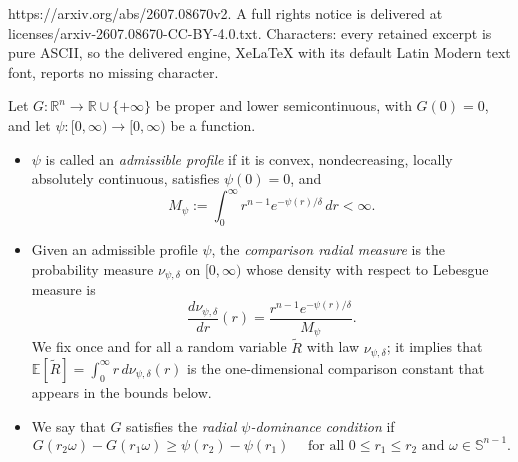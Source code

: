 \documentclass[10pt,a4paper]{amsart}
\begin{document}
https://arxiv.org/abs/2607.08670v2. A full rights notice is delivered at licenses/arxiv-2607.08670-CC-BY-4.0.txt. Characters: every retained excerpt is pure ASCII, so the delivered engine, XeLaTeX with its default Latin Modern text font, reports no missing character.
\begin{definition}Let $G\colon \mathbb{R}^n \to \mathbb{R}\cup \{+\infty\}$ be proper and lower semicontinuous, with $G(0)=0$, and let  $\psi\colon [0,\infty)\to [0,\infty)$ be a function. 
    \begin{itemize}
        \item $\psi$ is called an \emph{admissible profile} if it is convex, nondecreasing, locally absolutely continuous, satisfies $\psi(0)=0$, and 
        \begin{equation}\label{Admissible}
        M_{\psi} := \int_{0}^{\infty} r^{n-1}e^{-\psi(r)/\delta}\,dr <\infty.
        \end{equation}
        
        \item Given an admissible profile $\psi$, the \emph{comparison radial measure} is the probability measure  $\nu_{\psi,\delta}$ on $[0,\infty)$ whose density with respect to
    Lebesgue measure is
        $$
        \frac{d\nu_{\psi,\delta}}{dr}(r)=\frac{r^{n-1}e^{-\psi(r)/\delta}}{M_{\psi}}.
        $$
        We fix once and for all a random variable $\widetilde R$ with law $\nu_{\psi,\delta}$; it implies that  $\mathbb{E}[\widetilde R]=\int_0^\infty r\,d\nu_{\psi,\delta}(r)$ is the one-dimensional comparison constant that appears in the bounds below.
        \item   We say that $G$ satisfies the \emph{radial $\psi$-dominance condition} if
        \begin{equation}\label{dominance}
        G(r_2\omega)-G(r_1 \omega)\geq \psi(r_2)-\psi(r_1) \quad \textrm{ for all } 0\leq r_1\leq r_2 \textrm{ and } \omega \in \mathbb{S}^{n-1}.
        \end{equation}
    \end{itemize}
\end{definition}
\end{document}
